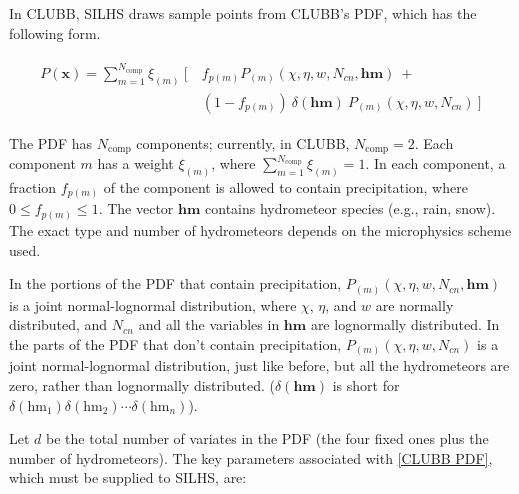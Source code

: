 \documentclass[11pt,fleqn]{article}
\begin{document}
In CLUBB, SILHS draws sample points from CLUBB's PDF, which has the following
form.

\begin{gather}
\begin{split}
P(\mathbf{x}) = \sum_{m=1}^{N_\mathrm{comp}} \xi_{(m)}\ [\ & f_{p(m)}
 P_{(m)}(\chi,\eta,w,N_{cn},\mathbf{hm})\ + \\
& (1-f_{p(m)})\ \delta(\mathbf{hm})\ P_{(m)}(\chi,\eta,w,N_{cn})\ ]
\end{split}
\label{CLUBB PDF}
\end{gather}

The PDF has $N_\mathrm{comp}$ components; currently, in CLUBB, $N_\mathrm{comp}
= 2$. Each component $m$ has a weight $\xi_{(m)}$, where
$\sum_{m=1}^{N_\mathrm{comp}} \xi_{(m)} = 1$. In each component, a fraction
$f_{p(m)}$ of the component is allowed to contain precipitation, where $0 \le
f_{p(m)} \le 1$. The vector $\mathbf{hm}$ contains hydrometeor species (e.g.,
rain, snow). The exact type and number of hydrometeors depends on the
microphysics scheme used.

In the portions of the PDF that contain precipitation,
$P_{(m)}(\chi,\eta,w,N_{cn},\mathbf{hm})$ is a joint normal-lognormal
distribution, where $\chi$, $\eta$, and $w$ are normally distributed, and
$N_{cn}$ and all the variables in $\mathbf{hm}$ are lognormally distributed. In
the parts of the PDF that don't contain precipitation,
$P_{(m)}(\chi,\eta,w,N_{cn})$ is a joint normal-lognormal distribution, just
like before, but all the hydrometeors are zero, rather than lognormally
distributed.  ($\delta(\mathbf{hm})$ is short for
$\delta(\mathrm{hm}_1)\delta(\mathrm{hm}_2)\cdots\delta(\mathrm{hm}_n)$).

Let $d$ be the total number of variates in the PDF (the four fixed ones plus the
number of hydrometeors). The key parameters associated with \eqref{CLUBB PDF},
which must be supplied to SILHS, are:
\end{document}
